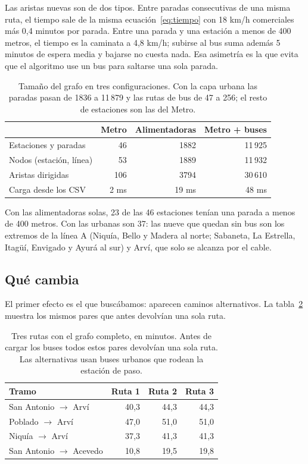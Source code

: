 \documentclass[11pt,a4paper]{article}
\begin{document}
Las aristas nuevas son de dos tipos. Entre paradas consecutivas de una misma
ruta, el tiempo sale de la misma ecuación~\eqref{eq:tiempo} con 18 km/h
comerciales más 0,4 minutos por parada. Entre una parada y una estación a menos
de 400 metros, el tiempo es la caminata a 4,8 km/h; subirse al bus suma además 5
minutos de espera media y bajarse no cuesta nada. Esa asimetría es la que evita
que el algoritmo use un bus para saltarse una sola parada.

\begin{table}[htbp]
\centering
\small
\begin{tabular}{lrrr}
\toprule
 & Metro & Alimentadoras & Metro + buses \\
\midrule
Estaciones y paradas        & 46      & 1882  & 11\,925 \\
Nodos (estación, línea)     & 53      & 1889  & 11\,932 \\
Aristas dirigidas           & 106     & 3794  & 30\,610 \\
Carga desde los CSV         & 2 ms    & 19 ms & 48 ms \\
\bottomrule
\end{tabular}
\caption{Tamaño del grafo en tres configuraciones. Con la capa urbana las paradas pasan de 1836 a 11\,879 y las rutas de bus de 47 a 256; el resto de estaciones son las del Metro.}
\label{tab:tamano}
\end{table}

Con las alimentadoras solas, 23 de las 46 estaciones tenían una parada a menos de
400 metros. Con las urbanas son 37: las nueve que quedan sin bus son los extremos
de la línea A (Niquía, Bello y Madera al norte; Sabaneta, La Estrella, Itagüí,
Envigado y Ayurá al sur) y Arví, que solo se alcanza por el cable.

\subsection{Qué cambia}

El primer efecto es el que buscábamos: aparecen caminos alternativos. La
tabla~\ref{tab:alternativas} muestra los mismos pares que antes devolvían una
sola ruta.

\begin{table}[htbp]
\centering
\small
\begin{tabular}{lrrr}
\toprule
Tramo & Ruta 1 & Ruta 2 & Ruta 3 \\
\midrule
San Antonio $\to$ Arví   & 40,3 & 44,3 & 44,3 \\
Poblado $\to$ Arví       & 47,0 & 51,0 & 51,0 \\
Niquía $\to$ Arví        & 37,3 & 41,3 & 41,3 \\
San Antonio $\to$ Acevedo & 10,8 & 19,5 & 19,8 \\
\bottomrule
\end{tabular}
\caption{Tres rutas con el grafo completo, en minutos. Antes de cargar los buses todos estos pares devolvían una sola ruta. Las alternativas usan buses urbanos que rodean la estación de paso.}
\label{tab:alternativas}
\end{table}
\end{document}
